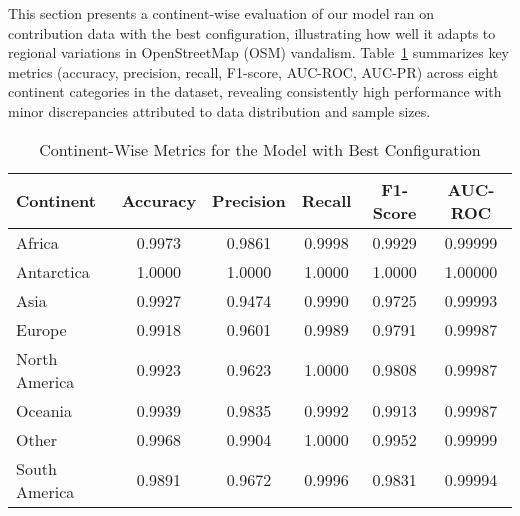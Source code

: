 \documentclass[
    13pt, %
    a4paper, %
    listof=totoc, %
    bibliography=totoc, %
    index=totoc, %
    headsepline
]{scrreprt}
\begin{document}
This section presents a continent-wise evaluation of our model ran on contribution data with the best configuration, illustrating how well it adapts to regional variations in OpenStreetMap (OSM) vandalism. Table~\ref{tab:geo_eval_metrics} summarizes key metrics (accuracy, precision, recall, F1-score, AUC-ROC, AUC-PR) across eight continent categories in the dataset, revealing consistently high performance with minor discrepancies attributed to data distribution and sample sizes.

\begin{table}[htbp]
    \centering
    \caption{Continent-Wise Metrics for the Model with Best Configuration}
    \label{tab:geo_eval_metrics}
    \vspace{1em}
    {%
    \begin{tabular}{lccccc}
    \toprule
    \textbf{Continent} & \textbf{Accuracy} & \textbf{Precision} & \textbf{Recall} & \textbf{F1-Score} & \textbf{AUC-ROC} \\
    \midrule
    Africa         & 0.9973 & 0.9861 & 0.9998 & 0.9929 & 0.99999 \\
    Antarctica     & 1.0000 & 1.0000 & 1.0000 & 1.0000 & 1.00000 \\
    Asia           & 0.9927 & 0.9474 & 0.9990 & 0.9725 & 0.99993 \\
    Europe         & 0.9918 & 0.9601 & 0.9989 & 0.9791 & 0.99987 \\
    North America  & 0.9923 & 0.9623 & 1.0000 & 0.9808 & 0.99987 \\
    Oceania        & 0.9939 & 0.9835 & 0.9992 & 0.9913 & 0.99987 \\
    Other          & 0.9968 & 0.9904 & 1.0000 & 0.9952 & 0.99999 \\
    South America  & 0.9891 & 0.9672 & 0.9996 & 0.9831 & 0.99994 \\
    \bottomrule
    \end{tabular}%
    }
\end{table}
\end{document}
